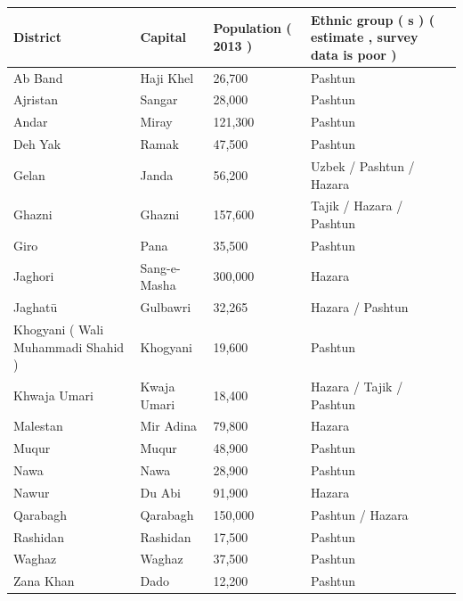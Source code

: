 \documentclass{article}
\begin{document}
\begin{tabular}{llll}
\toprule
District & Capital & Population ( 2013 ) & Ethnic group ( s ) ( estimate , survey data is poor ) \\
\midrule
Ab Band & Haji Khel & 26,700 & Pashtun \\
Ajristan & Sangar & 28,000 & Pashtun \\
Andar & Miray & 121,300 & Pashtun \\
Deh Yak & Ramak & 47,500 & Pashtun \\
Gelan & Janda & 56,200 & Uzbek / Pashtun / Hazara \\
Ghazni & Ghazni & 157,600 & Tajik / Hazara / Pashtun \\
Giro & Pana & 35,500 & Pashtun \\
Jaghori & Sang-e-Masha & 300,000 & Hazara \\
Jaghatū & Gulbawri & 32,265 & Hazara / Pashtun \\
Khogyani ( Wali Muhammadi Shahid ) & Khogyani & 19,600 & Pashtun \\
Khwaja Umari & Kwaja Umari & 18,400 & Hazara / Tajik / Pashtun \\
Malestan & Mir Adina & 79,800 & Hazara \\
Muqur & Muqur & 48,900 & Pashtun \\
Nawa & Nawa & 28,900 & Pashtun \\
Nawur & Du Abi & 91,900 & Hazara \\
Qarabagh & Qarabagh & 150,000 & Pashtun / Hazara \\
Rashidan & Rashidan & 17,500 & Pashtun \\
Waghaz & Waghaz & 37,500 & Pashtun \\
Zana Khan & Dado & 12,200 & Pashtun \\
\bottomrule
\end{tabular}
\end{document}
